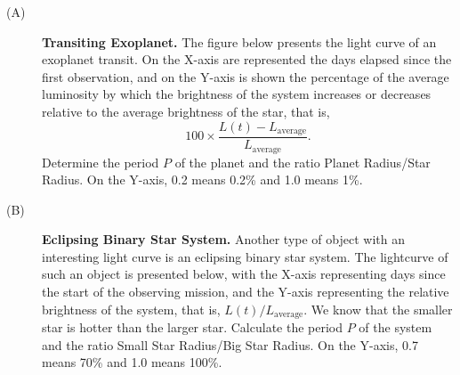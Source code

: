 \begin{description}
\item[(A)] \textbf{Transiting Exoplanet.} The figure below presents the light curve of an exoplanet transit. On the X-axis are represented the days elapsed since the first observation, and on the Y-axis is shown the percentage of the average luminosity by which the brightness of the system increases or decreases relative to the average brightness of the star, that is,
\[
100\times\frac{L(t)-L_{\mathrm{average}}}{L_{\mathrm{average}}}.
\]
Determine the period $P$ of the planet and the ratio Planet Radius/Star Radius.
On the Y-axis, 0.2 means 0.2\% and 1.0 means 1\%.
\item[(B)] \textbf{Eclipsing Binary Star System.} Another type of object with an interesting light curve is an eclipsing binary star system. The lightcurve of such an object is presented below, with the X-axis representing days since the start of the observing mission, and the Y-axis representing the relative brightness of the system, that is, $L(t)/L_{\mathrm{average}}$. We know that the smaller star is hotter than the larger star. Calculate the period $P$ of the system and the ratio Small Star Radius/Big Star Radius.
On the Y-axis, 0.7 means 70\% and 1.0 means 100\%.
\end{description}
